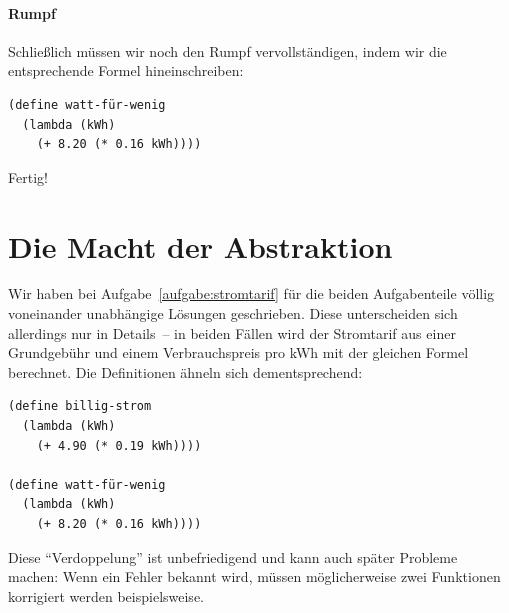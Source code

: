 \paragraph{Rumpf}

Schließlich müssen wir noch den Rumpf vervollständigen, indem wir die
entsprechende Formel hineinschreiben:
%
\begin{verbatim}
(define watt-für-wenig
  (lambda (kWh)
    (+ 8.20 (* 0.16 kWh))))
\end{verbatim}
%
Fertig!

\section{Die Macht der Abstraktion}

Wir haben bei Aufgabe~\ref{aufgabe:stromtarif} für die beiden
Aufgabenteile völlig voneinander unabhängige Lösungen geschrieben.
Diese unterscheiden sich allerdings nur in Details~-- in beiden Fällen
wird der Stromtarif aus einer Grundgebühr und einem Verbrauchspreis
pro kWh mit der gleichen Formel berechnet.  Die Definitionen ähneln
sich dementsprechend:
%
\begin{verbatim}
(define billig-strom
  (lambda (kWh)
    (+ 4.90 (* 0.19 kWh))))

(define watt-für-wenig
  (lambda (kWh)
    (+ 8.20 (* 0.16 kWh))))
\end{verbatim}
%
Diese "`Verdoppelung"' ist unbefriedigend und kann auch später
Probleme machen: Wenn ein Fehler bekannt wird, müssen möglicherweise
zwei Funktionen korrigiert werden beispielsweise.

